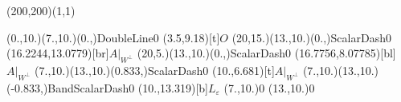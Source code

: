 \unitlength=1bp%

\begin{feynartspicture}(200,200)(1,1)

\FADiagram{}
\FAProp(0.,10.)(7.,10.)(0.,){DoubleLine}{0}
\FALabel(3.5,9.18)[t]{$O$}
\FAProp(20,15.)(13.,10.)(0.,){ScalarDash}{0}
\FALabel(16.2244,13.0779)[br]{$A|_{W^\perp}$}
\FAProp(20,5.)(13.,10.)(0.,){ScalarDash}{0}
\FALabel(16.7756,8.07785)[bl]{$A|_{W^\perp}$}
\FAProp(7.,10.)(13.,10.)(0.833,){ScalarDash}{0}
\FALabel(10.,6.681)[t]{$A|_{W^\perp}$}
\FAProp(7.,10.)(13.,10.)(-0.833,){BandScalarDash}{0}
\FALabel(10.,13.319)[b]{$L_\varepsilon$}
\FAVert(7.,10.){0}
\FAVert(13.,10.){0}
\end{feynartspicture}

